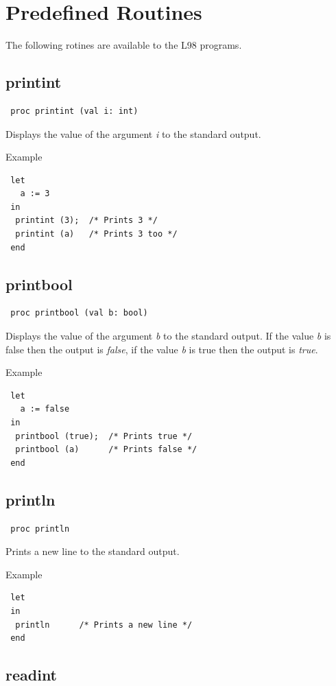 \documentclass[a4paper, 11pt]{report}
\newcommand{\subarg}[1]{\textsl{#1}}
\newcommand{\valconst}[1]{\textsl{#1}}
\begin{document}
\section{Predefined Routines}
\label{sct:routines}
The following rotines are available to the L98 programs.

\subsection{printint}

\begin{verbatim}
 proc printint (val i: int)
\end{verbatim}
Displays the value of the argument \subarg{i} to the standard output.

Example
\begin{lstlisting}
 let
   a := 3
 in
  printint (3);  /* Prints 3 */
  printint (a)   /* Prints 3 too */
 end
\end{lstlisting}


\subsection{printbool}

\begin{lstlisting}
 proc printbool (val b: bool)
\end{lstlisting}
Displays the value of the argument \subarg{b} to the standard output.
If the value \subarg{b} is false then the output is \valconst{false},
if the value \subarg{b} is true then the output is \valconst{true}.

Example
\begin{lstlisting}
 let
   a := false
 in
  printbool (true);  /* Prints true */
  printbool (a)      /* Prints false */
 end
\end{lstlisting}


\subsection{println}

\begin{lstlisting}
 proc println
\end{lstlisting}
Prints a new line to the standard output.

Example
\begin{lstlisting}
 let
 in
  println      /* Prints a new line */
 end
\end{lstlisting}


\subsection{readint}
\end{document}

